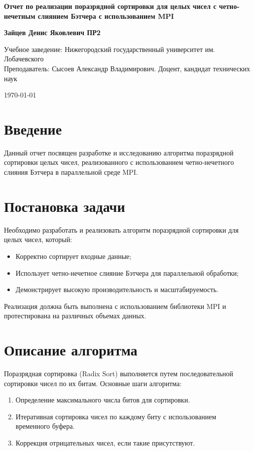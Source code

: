 \documentclass[12pt]{article}
\begin{document}
\begin{titlepage}
\begin{center}
    \vspace*{1cm}

    \textbf{\Large Отчет по реализации поразрядной сортировки для целых чисел с четно-нечетным слиянием Бэтчера с использованием MPI}

    \vspace{1.5cm}

    \textbf{Зайцев Денис Яковлевич ПР2}

    \vfill

    Учебное заведение: Нижегородский государственный университет им. Лобачевского \\
    Преподаватель: Сысоев Александр Владимирович. Доцент, кандидат технических наук

    \vspace{0.8cm}

    \today

\end{center}
\end{titlepage}

\tableofcontents
\newpage

\section{Введение}
Данный отчет посвящен разработке и исследованию алгоритма поразрядной сортировки целых чисел, реализованного с использованием четно-нечетного слияния Бэтчера в параллельной среде MPI.

\section{Постановка задачи}
Необходимо разработать и реализовать алгоритм поразрядной сортировки для целых чисел, который:
\begin{itemize}
    \item Корректно сортирует входные данные;
    \item Использует четно-нечетное слияние Бэтчера для параллельной обработки;
    \item Демонстрирует высокую производительность и масштабируемость.
\end{itemize}
Реализация должна быть выполнена с использованием библиотеки MPI и протестирована на различных объемах данных.

\section{Описание алгоритма}
Поразрядная сортировка (Radix Sort) выполняется путем последовательной сортировки чисел по их битам. Основные шаги алгоритма:
\begin{enumerate}
    \item Определение максимального числа битов для сортировки.
    \item Итеративная сортировка чисел по каждому биту с использованием временного буфера.
    \item Коррекция отрицательных чисел, если такие присутствуют.
\end{enumerate}
\end{document}
